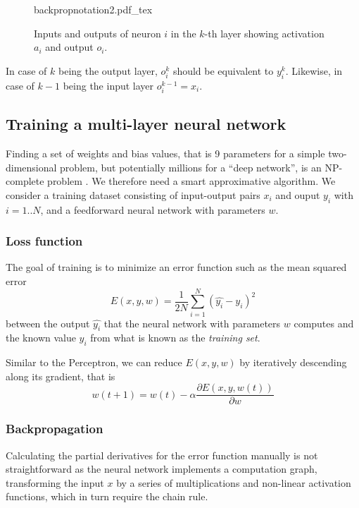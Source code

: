 \begin{figure}[htb]
    \centering
    \def\svgwidth{0.7\textwidth}
    {backpropnotation2.pdf_tex}
    \caption{Inputs and outputs of neuron $i$ in the $k$-th layer showing activation $a_i$ and output $o_i$.\label{fig:backpropnotation2}}
\end{figure}

In case of $k$ being the output layer, $o_i^k$ should be equivalent to $y_i^k$. Likewise, in case of $k-1$ being the input layer $o_i^{k-1}=x_i$.

\subsection{Training a multi-layer neural network}

Finding a set of weights and bias values, that is 9 parameters for a simple two-dimensional problem, but potentially millions for a ``deep network'', is an NP-complete problem \cite{blum1992training}. We therefore need a smart approximative algorithm. We consider a training dataset consisting of input-output pairs $x_i$ and ouput $y_i$ with $i=1..N$, and a feedforward neural network with parameters $w$.

\subsubsection{Loss function}
The goal of training is to minimize an error function such as the mean squared error
\begin{equation}
E(x,y,w)=\frac{1}{2N}\sum_{i=1}^{N}(\hat{y_i}-y_i)^2
\end{equation}
between the output $\hat{y_i}$ that the neural network with parameters $w$ computes and the known value $y_i$ from what is known as the \textsl{training set}.

Similar to the Perceptron, we can reduce $E(x,y,w)$ by iteratively descending along its gradient, that is
\begin{equation}
w(t+1)=w(t)-\alpha \frac{\partial E(x,y,w(t))}{\partial w}
\end{equation}

\subsubsection{Backpropagation}
Calculating the partial derivatives for the error function manually is not straightforward as the neural network implements a computation graph, transforming the input $x$ by a series of multiplications and non-linear activation functions, which in turn require the chain rule.

